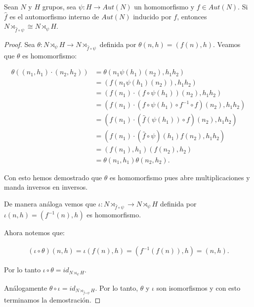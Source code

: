 Sean $N$ y $H$ grupos, sea $\psi : H \rightarrow Aut(N)$ un homomorfismo y $f \in Aut(N)$. 
Si $\hat{f}$ es el automorfismo interno de $Aut(N)$ inducido por $f$, entonces
$N \rtimes_{\hat{f} \circ \psi} \cong N \rtimes_\psi H$.\\

\begin{proof}
    Sea $\theta : N \rtimes_\psi H \rightarrow N \rtimes_{\hat{f} \circ \psi}$ definida por
    $\theta(n,h) = (f(n), h)$. Veamos que $\theta$ es homomorfismo:
    
    \begin{align}
        \theta((n_1, h_1)\cdot(n_2, h_2))&= \theta(n_1 \psi(h_1)(n_2), h_1 h_2) \\
                                         &= (f(n_1 \psi(h_1)(n_2)), h_1 h_2)  \\
                                         &= (f(n_1) \cdot (f\circ\psi(h_1))(n_2), h_1 h_2) \\
                                         &= (f(n_1) \cdot (f \circ \psi(h_1) \circ f^{-1} \circ f) (n_2), h_1 h_2) \\
                                         &= (f(n_1) \cdot (\hat{f}(\psi(h_1)) \circ f) (n_2), h_1 h_2) \\
                                         &= (f(n_1) \cdot (\hat{f} \circ \psi)(h_1) f(n_2), h_1 h_2) \\
                                         &= (f(n_1), h_1) (f(n_2), h_2)\\
                                         &= \theta(n_1, h_1) \theta(n_2, h_2).
    \end{align}
    
    Con esto hemos demostrado que $\theta$ es homomorfismo pues abre multiplicaciones y manda inversos en 				
    inversos.\par\null
    
    De manera análoga vemos que $\iota : N \rtimes_{\hat{f} \circ \psi} \rightarrow N \rtimes_\psi H $ 
    definida por $\iota(n,h) = (f^{-1}(n), h)$ es homomorfismo.\par\null
    
    Ahora notemos que:
    
    \begin{align}
        (\iota \circ \theta) (n, h) = \iota(f(n), h) = (f^{-1}(f(n)), h) = (n,h).
    \end{align}		
    
    Por lo tanto $\iota \circ \theta = id_{N \rtimes_\psi H}$.\par\null
    
    An\'alogamente $\theta \circ \iota = id_{N \rtimes_{\hat{f} \circ \psi} H}$. Por lo tanto, $\theta$ y 
    $\iota$ son isomorfismos y con esto terminamos la demostración.
\end{proof}